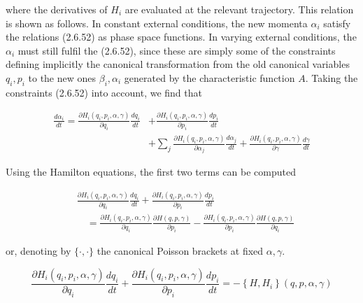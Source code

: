 \documentclass{article}
\begin{document}
where the derivatives of $H_{i}$ are evaluated at the relevant trajectory. This relation is shown as follows. In constant external conditions, the new momenta $\alpha_{i}$ satisfy the relations (2.6.52) as phase space functions. In varying external conditions, the $\alpha_{i}$ must still fulfil the (2.6.52), since these are simply some of the constraints defining implicitly the canonical transformation from the old canonical variables $q_{i}, p_{i}$ to the new ones $\beta_{i}, \alpha_{i}$ generated by the characteristic function $A$. Taking the constraints (2.6.52) into account, we find that
 
\begin{align*}
\frac{d \alpha_{i}}{d t}=\frac{\partial H_{i}\left(q_{i}, p_{i}, \alpha, \gamma\right)}{\partial q_{i}} \frac{d q_{i}}{d t} & +\frac{\partial H_{i}\left(q_{i}, p_{i}, \alpha, \gamma\right)}{\partial p_{i}} \frac{d p_{i}}{d t}  \tag{2.6.62}\\
& +\sum_{j} \frac{\partial H_{i}\left(q_{i}, p_{i}, \alpha, \gamma\right)}{\partial \alpha_{j}} \frac{d \alpha_{j}}{d t}+\frac{\partial H_{i}\left(q_{i}, p_{i}, \alpha, \gamma\right)}{\partial \gamma} \frac{d \gamma}{d t}
\end{align*}
 

Using the Hamilton equations, the first two terms can be computed
 
\begin{align*}
& \frac{\partial H_{i}\left(q_{i}, p_{i}, \alpha, \gamma\right)}{\partial q_{i}} \frac{d q_{i}}{d t}+\frac{\partial H_{i}\left(q_{i}, p_{i}, \alpha, \gamma\right)}{\partial p_{i}} \frac{d p_{i}}{d t}  \tag{2.6.63}\\
& \quad=\frac{\partial H_{i}\left(q_{i}, p_{i}, \alpha, \gamma\right)}{\partial q_{i}} \frac{\partial H(q, p, \gamma)}{\partial p_{i}}-\frac{\partial H_{i}\left(q_{i}, p_{i}, \alpha, \gamma\right)}{\partial p_{i}} \frac{\partial H(q, p, \gamma)}{\partial q_{i}}
\end{align*}
 
or, denoting by $\{\cdot, \cdot\}$ the canonical Poisson brackets at fixed $\alpha, \gamma$.
 
\begin{equation*}
\frac{\partial H_{i}\left(q_{i}, p_{i}, \alpha, \gamma\right)}{\partial q_{i}} \frac{d q_{i}}{d t}+\frac{\partial H_{i}\left(q_{i}, p_{i}, \alpha, \gamma\right)}{\partial p_{i}} \frac{d p_{i}}{d t}=-\left\{H, H_{i}\right\}(q, p, \alpha, \gamma) \tag{2.6.64}
\end{equation*}
 
\end{document}
